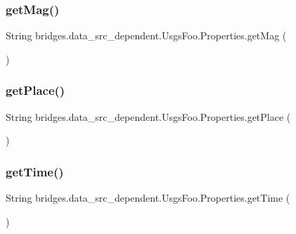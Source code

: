 \subsubsection{\texorpdfstring{get\+Mag()}{getMag()}}
{\footnotesize\ttfamily String bridges.\+data\+\_\+src\+\_\+dependent.\+Usgs\+Foo.\+Properties.\+get\+Mag (\begin{DoxyParamCaption}{ }\end{DoxyParamCaption})}

\hypertarget{classbridges_1_1data__src__dependent_1_1_usgs_foo_1_1_properties_ae97633cdfd1a3c6420ea7c38ed4155a2}{}\label{classbridges_1_1data__src__dependent_1_1_usgs_foo_1_1_properties_ae97633cdfd1a3c6420ea7c38ed4155a2} 
\subsubsection{\texorpdfstring{get\+Place()}{getPlace()}}
{\footnotesize\ttfamily String bridges.\+data\+\_\+src\+\_\+dependent.\+Usgs\+Foo.\+Properties.\+get\+Place (\begin{DoxyParamCaption}{ }\end{DoxyParamCaption})}

\hypertarget{classbridges_1_1data__src__dependent_1_1_usgs_foo_1_1_properties_abf80c8378da2b28708f49e9cf5bdf2d8}{}\label{classbridges_1_1data__src__dependent_1_1_usgs_foo_1_1_properties_abf80c8378da2b28708f49e9cf5bdf2d8} 
\subsubsection{\texorpdfstring{get\+Time()}{getTime()}}
{\footnotesize\ttfamily String bridges.\+data\+\_\+src\+\_\+dependent.\+Usgs\+Foo.\+Properties.\+get\+Time (\begin{DoxyParamCaption}{ }\end{DoxyParamCaption})}

